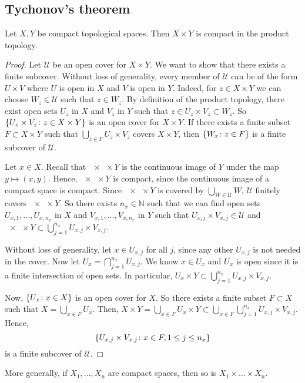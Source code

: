 \subsection{Tychonov's theorem}
\begin{theorem}
	Let \( X, Y \) be compact topological spaces.
	Then \( X \times Y \) is compact in the product topology.
\end{theorem}
\begin{proof}
	Let \( \mathcal U \) be an open cover for \( X \times Y \).
	We want to show that there exists a finite subcover.
	Without loss of generality, every member of \( \mathcal U \) can be of the form \( U \times V \) where \( U \) is open in \( X \) and \( V \) is open in \( Y \).
	Indeed, for \( z \in X \times Y \) we can choose \( W_z \in \mathcal U \) such that \( z \in W_z \).
	By definition of the product topology, there exist open sets \( U_z \) in \( X \) and \( V_z \) in \( Y \) such that \( z \in U_z \times V_z \subset W_z \).
	So \( \qty{U_z \times V_z \colon z \in X \times Y} \) is an open cover for \( X \times Y \).
	If there exists a finite subset \( F \subset X \times Y \) such that \( \bigcup_{z \in F} U_z \times V_z \) covers \( X \times Y \), then \( \qty{W_x \colon z \in F} \) is a finite subcover of \( \mathcal U \).

	Let \( x \in X \).
	Recall that \( \qty{x} \times Y \) is the continuous image of \( Y \) under the map \( y \mapsto (x,y) \).
	Hence, \( \qty{x} \times Y \) is compact, since the continuous image of a compact space is compact.
	Since \( \qty{x} \times Y \) is covered by \( \bigcup_{W \in \mathcal U} W \), \( \mathcal U \) finitely covers \( \qty{x} \times Y \).
	So there exists \( n_x \in \mathbb N \) such that we can find open sets \( U_{x,1}, \dots, U_{x,n_x} \) in \( X \) and \( V_{x,1}, \dots, V_{x, n_x} \) in \( Y \) such that \( U_{x,j} \times V_{x,j} \in \mathcal U \) and \( \qty{x} \times Y \subset \bigcup_{j=1}^{n_x} U_{x,j} \times V_{x,j} \).

	Without loss of generality, let \( x \in U_{x,j} \) for all \( j \), since any other \( U_{x,j} \) is not needed in the cover.
	Now let \( U_x = \bigcap_{j = 1}^{n_x} U_{x,j} \).
	We know \( x \in U_x \) and \( U_x \) is open since it is a finite intersection of open sets.
	In particular, \( U_x \times Y \subset \bigcup_{j=1}^{n_x} U_{x,j} \times V_{x,j} \).

	Now, \( \qty{U_x \colon x \in X} \) is an open cover for \( X \).
	So there exists a finite subset \( F \subset X \) such that \( X = \bigcup_{x \in F} U_x \).
	Then, \( X \times Y = \bigcup_{x \in F} U_x \times Y \subset \bigcup_{x \in F} \bigcup_{j = 1}^{n_x} U_{x,j} \times V_{x,j} \).
	Hence,
	\[
		\qty{U_{x,j} \times V_{x,j} \colon x \in F, 1 \leq j \leq n_x}
	\]
	is a finite subcover of \( \mathcal U \).
\end{proof}
\begin{remark}
	More generally, if \( X_1, \dots, X_n \) are compact spaces, then so is \( X_1 \times \dots \times X_n \).
\end{remark}
